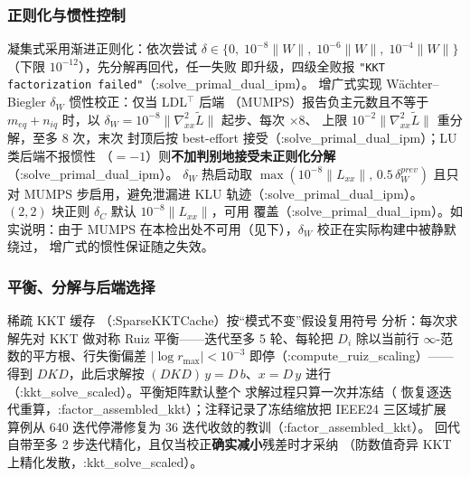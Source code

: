 \subsubsection*{正则化与惯性控制}
凝集式采用渐进正则化：依次尝试
$\delta\in\{0,\;10^{-8}\lVert W\rVert,\;10^{-6}\lVert W\rVert,
\;10^{-4}\lVert W\rVert\}$（下限 $10^{-12}$），先分解再回代，任一失败
即升级，四级全败报 \texttt{"KKT factorization failed"}（:solve\_primal\_dual\_ipm）。
增广式实现 Wächter--Biegler $\delta_W$ 惯性校正：仅当 LDL$^{\top}$ 后端
（MUMPS）报告负主元数且不等于 $m_{eq}+n_{iq}$ 时，以
$\delta_W=10^{-8}\lVert\nabla^2_{xx}\tilde L\rVert$ 起步、每次 $\times8$、
上限 $10^{-2}\lVert\nabla^2_{xx}\tilde L\rVert$ 重分解，至多 8 次，末次
封顶后按 best-effort 接受（:solve\_primal\_dual\_ipm）；LU 类后端不报惯性
（$=-1$）则\textbf{不加判别地接受未正则化分解}（:solve\_primal\_dual\_ipm）。
$\delta_W$ 热启动取 $\max(10^{-8}\lVert L_{xx}\rVert,\,0.5\,\delta_W^{prev})$
且只对 MUMPS 步启用，避免泄漏进 KLU 轨迹（:solve\_primal\_dual\_ipm）。$(2,2)$ 块正则
$\delta_C$ 默认 $10^{-8}\lVert L_{xx}\rVert$，可用
 覆盖（:solve\_primal\_dual\_ipm）。如实说明：由于
MUMPS 在本检出处不可用（见下），$\delta_W$ 校正在实际构建中被静默绕过，
增广式的惯性保证随之失效。

\subsubsection*{平衡、分解与后端选择}
稀疏 KKT 缓存 （:SparseKKTCache）按“模式不变”假设复用符号
分析：每次求解先对 KKT 做对称 Ruiz 平衡——迭代至多 5 轮、每轮把
$D_i$ 除以当前行 $\infty$-范数的平方根、行失衡偏差 $|\log r_{\max}|<10^{-3}$
即停（:compute\_ruiz\_scaling）——得到 $D\!KD$，此后求解按
$(D\!KD)\,y=D\,b$、$x=D\,y$ 进行（:kkt\_solve\_scaled）。平衡矩阵默认整个
求解过程只算一次并冻结（
恢复逐迭代重算，:factor\_assembled\_kkt）；注释记录了冻结缩放把 IEEE24 三区域扩展
算例从 640 迭代停滞修复为 36 迭代收敛的教训（:factor\_assembled\_kkt）。
回代自带至多 2 步迭代精化，且仅当校正\textbf{确实减小}残差时才采纳
（防数值奇异 KKT 上精化发散，:kkt\_solve\_scaled）。

